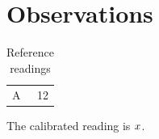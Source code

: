 \section{Observations}
\begin{table}
\caption{Reference readings}
\label{tab:reading}
\begin{tabular}{lr}A & 12\\\end{tabular}
\end{table}
The calibrated reading is $x$.
